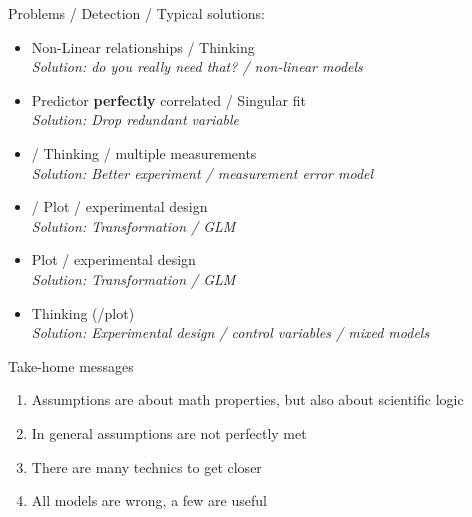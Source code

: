 \documentclass{beamer}\usepackage[]{graphicx}\usepackage[]{color}
\begin{document}
\begin{frame}{Problems / {\color{blue!50}Detection} / {\color{green!50!black}Typical solutions:}}
   \begin{block}{}
     \begin{itemize}[<+->]
      \item Non-Linear relationships / {\color{blue!50} Thinking}\\ \textit{\color{green!50!black}Solution: do you really need that? / non-linear models}
      \item Predictor \textbf{perfectly} correlated / {\color{blue!50} Singular fit}\\ \textit{\color{green!50!black}Solution: Drop redundant variable}
       \item {\color{red!20!black}{Error in predictors}} / {\color{blue!50} Thinking / multiple measurements} \\ \textit{\color{green!50!black}Solution: Better experiment / measurement error model}
       \item {} / {\color{blue!50} Plot / experimental design}\\ \textit{\color{green!50!black}Solution: Transformation / GLM}
       \item {\color{red!70!black}{Changing error variance}} {\color{blue!50} Plot / experimental design}\\ \textit{\color{green!50!black}Solution: Transformation / GLM}
       \item {\color{red!99!black}{Correlated errors}} {\color{blue!50} Thinking (/plot)}\\ \textit{\color{green!50!black}Solution: Experimental design / control variables / mixed models}
     \end{itemize}
 \end{block}
\end{frame}


\begin{frame}{Take-home messages}
  \begin{enumerate}[<+->]
    \item Assumptions are about math properties, but also about scientific logic
    \item In general assumptions are not perfectly met
    \item There are many technics to get closer
    \item All models are wrong, a few are useful
  \end{enumerate}
\end{frame}
\end{document}
